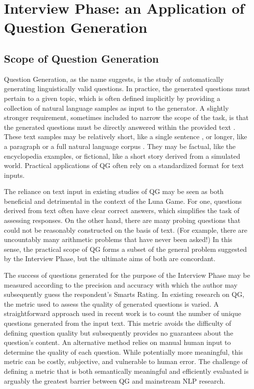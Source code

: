 \section{Interview Phase: an Application of Question Generation}

\subsection{Scope of Question Generation}

Question Generation, as the name suggests, is the study of automatically generating linguistically valid questions. In practice, the generated questions must pertain to a given topic, which is often defined implicitly by providing a collection of natural language samples as input to the generator. A slightly stronger requirement, sometimes included to narrow the scope of the task, is that the generated questions must be directly answered within the provided text  \citep{rus2011question, heilman2011automatic} . These text samples may be relatively short, like a single sentence  \citep{ali2010automatic, rus2011question}, or longer, like a paragraph  \citep{mannem2010question} or a full natural language corpus  \citep{heilman2011automatic}. They may be factual, like the encyclopedia examples, or fictional, like a short story derived from a simulated world. Practical applications of QG often rely on a standardized format for text inputs. 

The reliance on text input in existing studies of QG may be seen as both beneficial and detrimental in the context of the Luna Game. For one, questions derived from text often have clear correct answers, which simplifies the task of assessing responses. On the other hand, there are many probing questions that could not be reasonably constructed on the basis of text. (For example, there are uncountably many arithmetic problems that have never been asked!) In this sense, the practical scope of QG forms a subset of the general problem suggested by the Interview Phase, but the ultimate aims of both are concordant. 

The success of questions generated for the purpose of the Interview Phase may be measured according to the precision and accuracy with which the author may subsequently guess the respondent's Smarts Rating. In existing research on QG, the metric used to assess the quality of generated questions is varied. A straightforward approach used in recent work is to count the number of unique questions generated from the input text. This metric avoids the difficulty of defining question quality but subsequently provides no guarantees about the question's content. An alternative method relies on manual human input to determine the quality of each question. While potentially more meaningful, this metric can be costly, subjective, and vulnerable to human error. The challenge of defining a metric that is both semantically meaningful and efficiently evaluated is arguably the greatest barrier between QG and mainstream NLP research.

